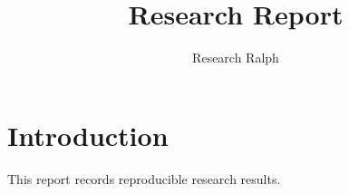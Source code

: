 \documentclass{article}
\title{Research Report}
\author{Research Ralph}
\begin{document}
\maketitle
\section{Introduction}
This report records reproducible research results.
\end{document}
